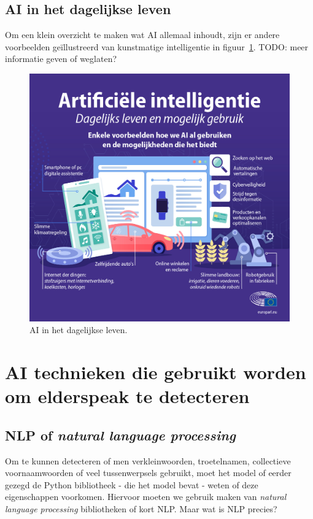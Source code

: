 \subsection{AI in het dagelijkse leven}
Om een klein overzicht te maken wat AI allemaal inhoudt, zijn er andere voorbeelden geïllustreerd van kunstmatige intelligentie in figuur~\ref{fig:ai_dagelijkse_leven}.
TODO: meer informatie geven of weglaten?

\begin{figure}
    \centering
    \includegraphics[width=.8\textwidth]{./img/ai_voorbeelden.jpg}
    \caption{\label{fig:ai_dagelijkse_leven} AI in het dagelijkse leven.~\autocite{EuropeesParlement2020}}
\end{figure}

\section{AI technieken die gebruikt worden om elderspeak te detecteren}

\subsection{NLP of \textit{natural language processing}}
Om te kunnen detecteren of men verkleinwoorden, troetelnamen, collectieve voornaamwoorden of veel tussenwerpsels gebruikt, moet het model of eerder gezegd de Python bibliotheek - die het model bevat - weten of deze eigenschappen voorkomen. Hiervoor moeten we gebruik maken van \textit{natural language processing} bibliotheken of kort NLP. Maar wat is NLP precies?

